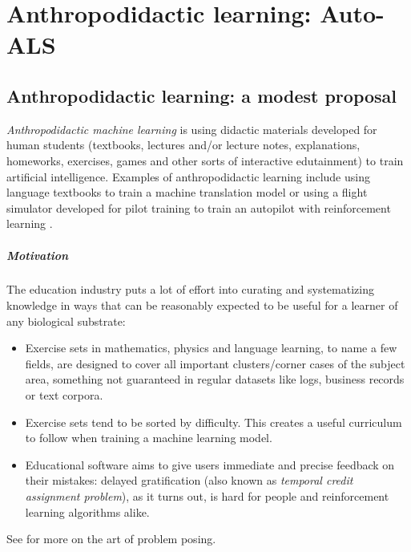 \chapter{Anthropodidactic learning: Auto-ALS}
\label{ch:auto-als}

\section{Anthropodidactic learning: a modest proposal}
\label{sec:anthropodidactic}

\emph{Anthropodidactic machine learning} is using didactic materials developed for human students (textbooks, lectures and/or lecture notes, explanations, homeworks, exercises, games and other sorts of interactive edutainment) to train artificial intelligence.
Examples of anthropodidactic learning include using language textbooks to train a machine translation model or using a flight simulator developed for pilot training to train an autopilot with reinforcement learning \cite{staudingerXPlaneMLEnvironmentLearning2018}.

\paragraph{Motivation}

The education industry puts a lot of effort into curating and systematizing knowledge in ways that can be reasonably expected to be useful for a learner of any biological substrate:
\begin{itemize}
    \item Exercise sets in mathematics, physics and language learning, to name a few fields, are designed to cover all important clusters/corner cases of the subject area, something not guaranteed in regular datasets like logs, business records or text corpora.
    \item Exercise sets tend to be sorted by difficulty. This creates a useful curriculum to follow when training a machine learning model.
    \item Educational software aims to give users immediate and precise feedback on their mistakes: delayed gratification (also known as \emph{temporal credit assignment problem}), as it turns out, is hard for people \cite{tobinDelayGratificationReview2010} and reinforcement learning algorithms alike.
\end{itemize}

See \cite{brownArtProblemPosing2005} for more on the art of problem posing.

